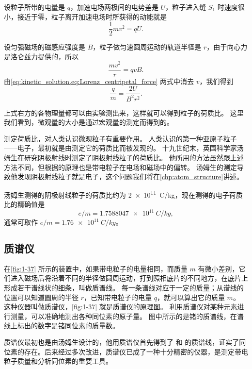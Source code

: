 设粒子所带的电量是 $q$，加速电场两极间的电势差是 $U$，粒子进入缝 $S_1$ 时速度很小，接近于零，粒子离开加速电场时所获得的动能就是
\begin{equation}
  \label{eq:kinetic_solution}
  \frac{1}{2}mv^2=qU.    
\end{equation}

设匀强磁场的磁感应强度是 $B$，粒子做匀速圆周运动的轨道半径是 $r$，由于向心力是洛仑兹力提供的，所以
\begin{equation}
  \label{eq:Lorenz_centripetal_force}
  \frac{mv^2}{r}=qvB.
\end{equation}
由\cref{eq:kinetic_solution,eq:Lorenz_centripetal_force} 两式中消去 $v$，我们得到
\[\frac{q}{m}=\frac{2U}{B^2r^2}.\]

上式右方的各物理量都可以由实验测出来，这样就可以得到粒子的荷质比。
这里我们看到，微观量的大小是通过宏观量的测定而得到的。

测定荷质比，对人类认识微观粒子有重要作用。
人类认识的第一种亚原子粒子——电子，最初就是由测定它的荷质比而被发现的。
十九世纪末，英国科学家汤姆生在研究阴极射线时测定了阴极射线粒子的荷质比。
他所用的方法虽然跟上述方法不同，但根据的原理也是带电粒子在电场和磁场中的偏转。
汤姆生的测定导致他发现阴极射线粒子就是电子，这个问题我们将在\cref{chp:atom_structure}讲述。

汤姆生测得的阴极射线粒子的荷质比约为 \qty{2e11}{C/kg}，现在测得的电子荷质比的精确值是
\[e/m=\qty{1.7588047e11}{C/kg},\]
通常可取作 $e/m=\qty{1.76e11}{C/kg}$。

\subsection{质谱仪}

在\cref{fig:1-37} 所示的装置中，如果带电粒子的电量相同，而质量 $m$ 有微小差别，它们进入磁场后将沿着不同的半径做圆周运动，打到照相底片的不同地方，在底片上形成若干谱线状的细条，叫做质谱线。
每一条谱线对应于一定的质量；从谱线的位置可以知道圆周的半径 $r$，已知带电粒子的电量 $q$，就可以算出它的质量 $m$。
这种仪器叫做质谱仪，\cref{fig:1-37} 就是质谱仪的原理图。
利用质谱仪对某种元素进行测量，可以准确地测出各种同位素的原子量。
图中所示的是锗的质谱线，在谱线上标出的数字是锗同位素的质量数。

质谱仪最初也是由汤姆生设计的，他用质谱仪首先得到了  和  的质谱线，证实了同位素的存在。后来经过多次改进，质谱仪已成了一种十分精密的仪器，是测定带电粒子质量和分析同位素的重要工具。


